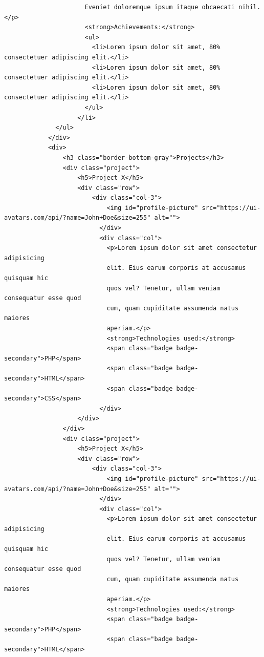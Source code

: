 \documentclass{article}
\begin{document}
\begin{verbatim}
                      Eveniet doloremque ipsum itaque obcaecati nihil.</p>
                      <strong>Achievements:</strong>
                      <ul>
                        <li>Lorem ipsum dolor sit amet, 80% consectetuer adipiscing elit.</li>
                        <li>Lorem ipsum dolor sit amet, 80% consectetuer adipiscing elit.</li>
                        <li>Lorem ipsum dolor sit amet, 80% consectetuer adipiscing elit.</li>
                      </ul>
                    </li>
              </ul>
            </div>
            <div>
                <h3 class="border-bottom-gray">Projects</h3>
                <div class="project">
                    <h5>Project X</h5>
                    <div class="row">
                        <div class="col-3">
                            <img id="profile-picture" src="https://ui-avatars.com/api/?name=John+Doe&size=255" alt="">
                          </div>
                          <div class="col">
                            <p>Lorem ipsum dolor sit amet consectetur adipisicing
                            elit. Eius earum corporis at accusamus quisquam hic
                            quos vel? Tenetur, ullam veniam consequatur esse quod
                            cum, quam cupiditate assumenda natus maiores
                            aperiam.</p>
                            <strong>Technologies used:</strong>
                            <span class="badge badge-secondary">PHP</span>
                            <span class="badge badge-secondary">HTML</span>
                            <span class="badge badge-secondary">CSS</span>
                          </div>
                    </div>
                </div>
                <div class="project">
                    <h5>Project X</h5>
                    <div class="row">
                        <div class="col-3">
                            <img id="profile-picture" src="https://ui-avatars.com/api/?name=John+Doe&size=255" alt="">
                          </div>
                          <div class="col">
                            <p>Lorem ipsum dolor sit amet consectetur adipisicing
                            elit. Eius earum corporis at accusamus quisquam hic
                            quos vel? Tenetur, ullam veniam consequatur esse quod
                            cum, quam cupiditate assumenda natus maiores
                            aperiam.</p>
                            <strong>Technologies used:</strong>
                            <span class="badge badge-secondary">PHP</span>
                            <span class="badge badge-secondary">HTML</span>

\end{verbatim}
\end{document}
